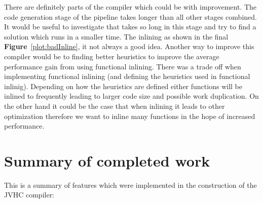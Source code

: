\documentclass[float=false, crop=false]{standalone}
\newcommand{\namefig}{\textbf{Figure}~}
\begin{document}
There are definitely parts of the compiler which could be with improvement.
The code generation stage of the pipeline takes longer than all other stages 
combined. It would be useful to investigate that takes so long in this
stage and try to find a solution which runs in a smaller time.
The inlining as shown in the final \namefig\ref{plot:badInline}, it 
not always a good idea. Another way to improve this compiler would
be to finding better heuristics to improve the average performance
gain from using functional inlining.
There was a trade off when implementing functional inlining (and defining
the heuristics used in functional inlinig).
Depending on how the heuristics are defined either functions will
be inlined to frequently leading to larger code size and possible
work duplication. On the other hand it could be the case that 
when inlining it leads to other optimization therefore we want to 
inline many functions in the hope of increased performance.

\section{Summary of completed work}

This is a summary of features which were implemented in the construction
of the JVHC compiler:
\end{document}
